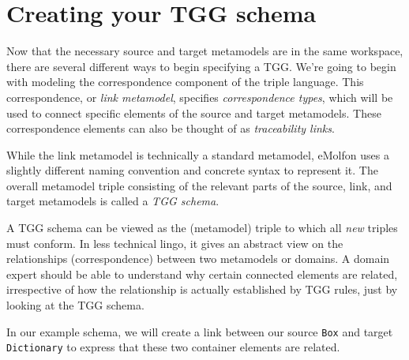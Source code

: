 \newpage
\hypertarget{TGGSchema}{}
\section{Creating your TGG schema}
\genHeader

Now that the necessary source and target metamodels are in the same workspace, there are several different ways to begin specifying a TGG. We're going to begin
with modeling the correspondence component of the triple language. This correspondence, or \emph{link metamodel}, specifies
\emph{correspondence types}, which will be used to connect specific elements of the source and target metamodels. These
correspondence elements can also be thought of as \emph{traceability links}.

While the link metamodel is technically a standard metamodel, eMolfon uses a slightly different naming convention and concrete syntax to represent it. The
overall metamodel triple consisting of the relevant parts of the source, link, and target metamodels is called a \emph{TGG schema}.

A TGG schema can be viewed as the (metamodel) triple to which all \emph{new} triples must conform. In less technical lingo, it gives an abstract view on the
relationships (correspondence) between two metamodels or domains. A domain expert should be able to understand why certain connected elements are related,
irrespective of how the relationship is actually established by TGG rules, just by looking at the TGG schema. 

In our example schema, we will create a link between our source \texttt{Box} and target \texttt{Dictionary} to express that these two container elements are
related.





